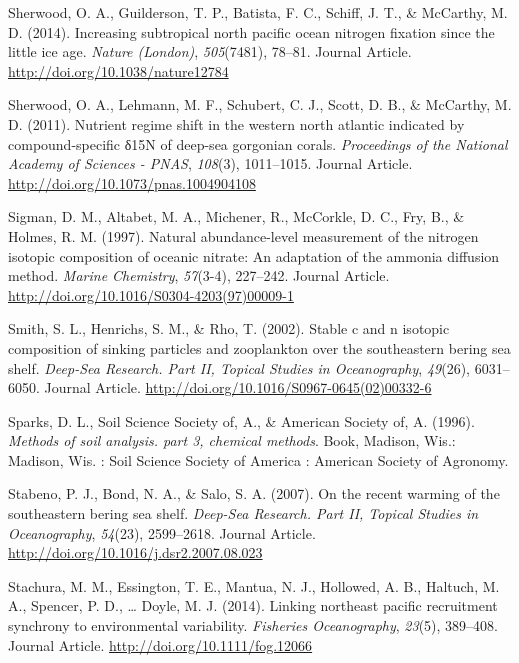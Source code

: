 \documentclass [11pt, proquest] {uwthesis}[2015/03/03]
\begin{document}
\hypertarget{ref-Sherwood2014}{}
Sherwood, O. A., Guilderson, T. P., Batista, F. C., Schiff, J. T., \&
McCarthy, M. D. (2014). Increasing subtropical north pacific ocean
nitrogen fixation since the little ice age. \emph{Nature (London)},
\emph{505}(7481), 78--81. Journal Article.
\url{http://doi.org/10.1038/nature12784}

\hypertarget{ref-Sherwood2011}{}
Sherwood, O. A., Lehmann, M. F., Schubert, C. J., Scott, D. B., \&
McCarthy, M. D. (2011). Nutrient regime shift in the western north
atlantic indicated by compound-specific δ15N of deep-sea gorgonian
corals. \emph{Proceedings of the National Academy of Sciences - PNAS},
\emph{108}(3), 1011--1015. Journal Article.
\url{http://doi.org/10.1073/pnas.1004904108}

\hypertarget{ref-Sigman1997}{}
Sigman, D. M., Altabet, M. A., Michener, R., McCorkle, D. C., Fry, B.,
\& Holmes, R. M. (1997). Natural abundance-level measurement of the
nitrogen isotopic composition of oceanic nitrate: An adaptation of the
ammonia diffusion method. \emph{Marine Chemistry}, \emph{57}(3-4),
227--242. Journal Article.
\url{http://doi.org/10.1016/S0304-4203(97)00009-1}

\hypertarget{ref-Smith2002}{}
Smith, S. L., Henrichs, S. M., \& Rho, T. (2002). Stable c and n
isotopic composition of sinking particles and zooplankton over the
southeastern bering sea shelf. \emph{Deep-Sea Research. Part II, Topical
Studies in Oceanography}, \emph{49}(26), 6031--6050. Journal Article.
\url{http://doi.org/10.1016/S0967-0645(02)00332-6}

\hypertarget{ref-Sparks1996}{}
Sparks, D. L., Soil Science Society of, A., \& American Society of, A.
(1996). \emph{Methods of soil analysis. part 3, chemical methods}. Book,
Madison, Wis.: Madison, Wis. : Soil Science Society of America :
American Society of Agronomy.

\hypertarget{ref-Stabeno2007}{}
Stabeno, P. J., Bond, N. A., \& Salo, S. A. (2007). On the recent
warming of the southeastern bering sea shelf. \emph{Deep-Sea Research.
Part II, Topical Studies in Oceanography}, \emph{54}(23), 2599--2618.
Journal Article. \url{http://doi.org/10.1016/j.dsr2.2007.08.023}

\hypertarget{ref-Stachura2014}{}
Stachura, M. M., Essington, T. E., Mantua, N. J., Hollowed, A. B.,
Haltuch, M. A., Spencer, P. D., \ldots{} Doyle, M. J. (2014). Linking
northeast pacific recruitment synchrony to environmental variability.
\emph{Fisheries Oceanography}, \emph{23}(5), 389--408. Journal Article.
\url{http://doi.org/10.1111/fog.12066}
\end{document}
